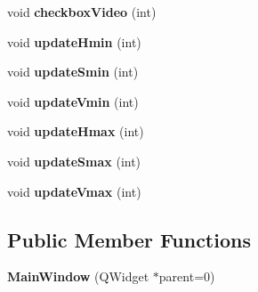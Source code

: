 \begin{DoxyCompactItemize}
\item 
\hypertarget{classMainWindow_a33f858356490a2440246af76ca922392}{void {\bfseries checkbox\-Video} (int)}\label{classMainWindow_a33f858356490a2440246af76ca922392}

\item 
\hypertarget{classMainWindow_afffdad16c118e2351cec7b47c243e9b1}{void {\bfseries update\-Hmin} (int)}\label{classMainWindow_afffdad16c118e2351cec7b47c243e9b1}

\item 
\hypertarget{classMainWindow_a11f3aa0b929685232b671cd378d31972}{void {\bfseries update\-Smin} (int)}\label{classMainWindow_a11f3aa0b929685232b671cd378d31972}

\item 
\hypertarget{classMainWindow_a43da847294670cdaaa17f2235888b47a}{void {\bfseries update\-Vmin} (int)}\label{classMainWindow_a43da847294670cdaaa17f2235888b47a}

\item 
\hypertarget{classMainWindow_af3d7639f0c28d053fdc10484b109ac99}{void {\bfseries update\-Hmax} (int)}\label{classMainWindow_af3d7639f0c28d053fdc10484b109ac99}

\item 
\hypertarget{classMainWindow_a2c08d2f7c55d78c30b12dd3a16905d7b}{void {\bfseries update\-Smax} (int)}\label{classMainWindow_a2c08d2f7c55d78c30b12dd3a16905d7b}

\item 
\hypertarget{classMainWindow_a2f06abb52f3906ae6177f7fc9f859505}{void {\bfseries update\-Vmax} (int)}\label{classMainWindow_a2f06abb52f3906ae6177f7fc9f859505}

\end{DoxyCompactItemize}
\subsection*{Public Member Functions}
\begin{DoxyCompactItemize}
\item 
\hypertarget{classMainWindow_a8b244be8b7b7db1b08de2a2acb9409db}{{\bfseries Main\-Window} (Q\-Widget $\ast$parent=0)}\label{classMainWindow_a8b244be8b7b7db1b08de2a2acb9409db}

\end{DoxyCompactItemize}
